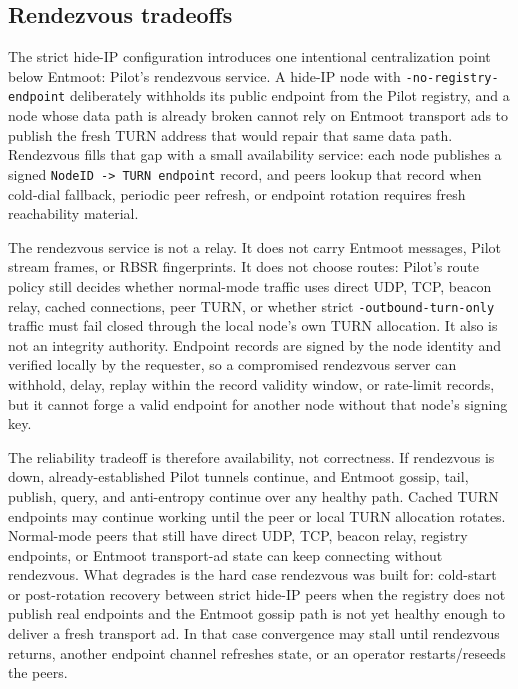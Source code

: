 \documentclass[11pt,a4paper,twocolumn]{article}
\begin{document}
\subsection{Rendezvous tradeoffs}
\label{sec:rendezvous}

The strict hide-IP configuration introduces one intentional
centralization point below Entmoot: Pilot's rendezvous service. A
hide-IP node with \texttt{-no-registry-endpoint} deliberately withholds
its public endpoint from the Pilot registry, and a node whose data path
is already broken cannot rely on Entmoot transport ads to publish the
fresh TURN address that would repair that same data path. Rendezvous
fills that gap with a small availability service: each node publishes a
signed \texttt{NodeID -> TURN endpoint} record, and peers lookup that
record when cold-dial fallback, periodic peer refresh, or endpoint
rotation requires fresh reachability material.

The rendezvous service is not a relay. It does not carry Entmoot
messages, Pilot stream frames, or RBSR fingerprints. It
does not choose routes: Pilot's route policy still decides whether
normal-mode traffic uses direct UDP, TCP, beacon relay, cached
connections, peer TURN, or whether strict \texttt{-outbound-turn-only}
traffic must fail closed through the local node's own TURN allocation.
It also is not an integrity authority. Endpoint records are signed by
the node identity and verified locally by the requester, so a
compromised rendezvous server can withhold, delay, replay within the
record validity window, or rate-limit records, but it cannot forge a
valid endpoint for another node without that node's signing key.

The reliability tradeoff is therefore availability, not correctness.
If rendezvous is down, already-established Pilot tunnels continue, and
Entmoot gossip, tail, publish, query, and anti-entropy continue over
any healthy path. Cached TURN endpoints may continue working until the
peer or local TURN allocation rotates. Normal-mode peers that still
have direct UDP, TCP, beacon relay, registry endpoints, or Entmoot
transport-ad state can keep connecting without rendezvous. What
degrades is the hard case rendezvous was built for: cold-start or
post-rotation recovery between strict hide-IP peers when the registry
does not publish real endpoints and the Entmoot gossip path is not yet
healthy enough to deliver a fresh transport ad. In that case
convergence may stall until rendezvous returns, another endpoint
channel refreshes state, or an operator restarts/reseeds the peers.
\end{document}
